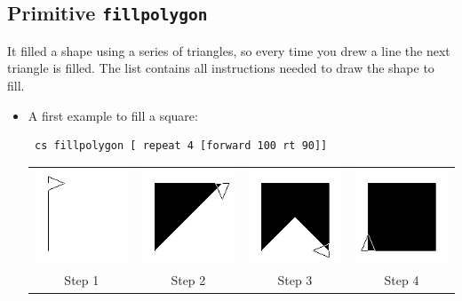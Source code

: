 \subsection{Primitive \texttt{fillpolygon}}
\noindent
{}
It filled a shape using a series of triangles, so every time you drew a line the next triangle is filled. The list contains all instructions needed to draw the shape to fill.\\
\begin{itemize}
 \item A first example to fill a square:
\begin{verbatim}
 cs fillpolygon [ repeat 4 [forward 100 rt 90]]
\end{verbatim}
\begin{center}
 \begin{tabular}{cccc}
 \includegraphics[width=3cm]{pics/fillpolygonsquare1.png}& \includegraphics[width=3cm]{pics/fillpolygonsquare2.png}& \includegraphics[width=3cm]{pics/fillpolygonsquare3.png}& \includegraphics[width=3cm]{pics/fillpolygonsquare4.png}\\ 
Step 1& Step 2& Step 3& Step 4\\
\end{tabular}

\end{center}
\end{itemize}
